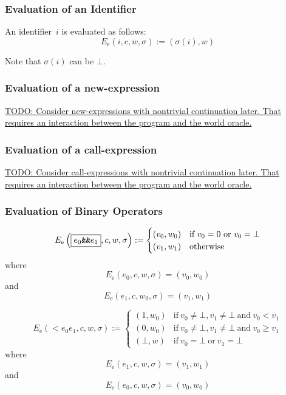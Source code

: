 \documentclass{book}
\newcommand{\todo}[1]{\underline{TODO: {#1}}}
\newcommand{\evalE}[1]{E_\mathrm{e}\left({#1}\right)}
\begin{document}
\subsubsection{Evaluation of an Identifier}

An identifier~$i$ is evaluated as follows:
\[
\evalE{\boxed{i}, c, w, \sigma} := (\sigma(i), w)
\]

Note that $\sigma(i)$ can be $\bot$.

\subsubsection{Evaluation of a new-expression}

\todo{Consider new-expressions with nontrivial continuation later.  That requires an interaction between the program and the world oracle. }

\subsubsection{Evaluation of a call-expression}

\todo{Consider call-expressions with nontrivial continuation later.  That requires an interaction between the program and the world oracle. }

\subsubsection{Evaluation of Binary Operators}

\[
\evalE{\boxed{\logicalAnd{e_0}{e_1}}, c, w, \sigma} :=
\begin{cases}
  (v_0, w_0) & \text{if}\ v_0 = 0\ \text{or}\ v_0 = \bot \\
  (v_1, w_1) & \text{otherwise}
\end{cases}
\]
where
\[
\evalE{\boxed{e_0}, c, w, \sigma} = (v_0, w_0)
\]
and
\[
\evalE{\boxed{e_1}, c, w_0, \sigma} = (v_1, w_1)
\]

\[
\evalE{\boxed{\lt{e_0}{e_1}}, c, w, \sigma} :=
\begin{cases}
  (1, w_0) &\text{if}\ v_0 \neq \bot, v_1 \neq\bot\ \text{and}\ v_0 < v_1 \\
  (0, w_0) &\text{if}\ v_0 \neq \bot, v_1 \neq\bot\ \text{and}\ v_0 \ge v_1 \\
  (\bot, w) &\text{if}\ v_0 = \bot \ \text{or}\ v_1 = \bot
\end{cases}
\]
where
\[
\evalE{\boxed{e_1}, c, w, \sigma} = (v_1, w_1)
\]
and
\[
\evalE{\boxed{e_0}, c, w, \sigma} = (v_0, w_0)
\]
\end{document}
